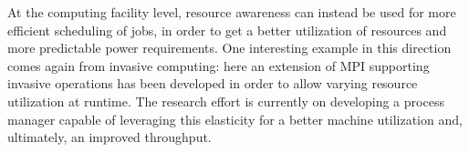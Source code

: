 At the computing facility level, resource awareness can instead be used for more efficient scheduling of jobs, in order to get a better utilization of resources and more predictable power requirements. One interesting example in this direction comes again from invasive computing: here an extension of MPI supporting invasive operations has been developed in order to allow varying resource utilization at runtime\cite{urena2012invasive}. The research effort is currently on developing a process manager capable of leveraging this elasticity for a better machine utilization and, ultimately, an improved throughput.


